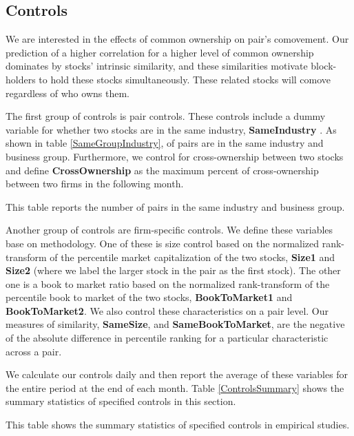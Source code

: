 \FloatBarrier


\subsection{Controls}

We are interested in the effects of common ownership on pair's comovement.
Our prediction of a higher correlation for a higher level of common ownership dominates by stocks' intrinsic similarity, and these similarities motivate block-holders to hold these stocks simultaneously. These related stocks will comove regardless of who owns them.

The first group of controls is pair controls. These controls include
a dummy variable for whether two stocks are in the same industry, \textbf{SameIndustry}
. As shown in table \ref{SameGroupIndustry}, of pairs are in the same industry and business group. Furthermore, we control for cross-ownership between two stocks and define  \textbf{CrossOwnership} as the maximum percent of cross-ownership between two firms in the following month.


	{\begin{table}[htbp]
			\caption{\scriptsize This table reports the number of pairs in the same industry and business group.}
			\label{SameGroupIndustry}
			\centering \scriptsize
			{
				
			}
	\end{table}}


Another group of controls are firm-specific controls.  We define these variables base on  \cite{AntonPolk} methodology. One of these is size control based on the normalized rank-transform of the percentile market capitalization of the two stocks, \textbf{Size1} and \textbf{Size2} (where we label the
larger stock in the pair as the first stock). The other one is a book to market ratio based on the normalized rank-transform of the percentile book to market of the two stocks, \textbf{BookToMarket1} and \textbf{BookToMarket2}.
We also control these characteristics on a pair level. Our measures of similarity, \textbf{SameSize}, and \textbf{SameBookToMarket}, are the negative of the absolute difference in percentile ranking for a particular characteristic across a pair.


We calculate our controls daily and then report the average of these variables for the entire period at the end of each month. Table \ref{ControlsSummary} shows the summary statistics of specified controls in this section.




 \begin{table}[htbp]
 \caption{\scriptsize This table shows the summary statistics of specified controls in empirical studies.}
 \label{ControlsSummary}
               \centering 
               \scriptsize
                 {
    
                 }
             \end{table}




